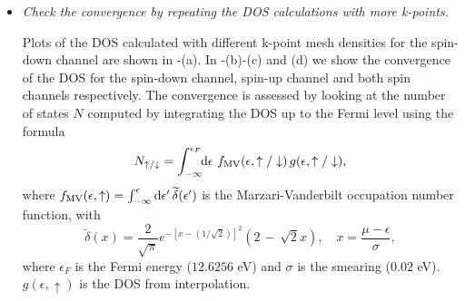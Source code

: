 \begin{itemize}
	\item {\it Check the convergence by repeating the DOS calculations with more k-points.}

	Plots of the DOS calculated with different k-point mesh densities for the spin-down channel are shown in -(a). In -(b)-(c) and (d) we show the convergence of the DOS for the spin-down channel, spin-up channel and both spin channels respectively. The convergence is assessed by looking at the number of states $N$ computed by integrating the DOS up to the Fermi level using the formula
	\begin{equation}
	N_{\uparrow/\downarrow} = \int_{-\infty}^{\epsilon_F}\!\! \mathrm{d}\epsilon\,\, f\tinysub{MV}(\epsilon,\uparrow/\downarrow)\, g(\epsilon,\uparrow/\downarrow),
	\end{equation}
	where $f\tinysub{MV}(\epsilon,\uparrow) = \int_{-\infty}^{\epsilon} \mathrm{d}\epsilon'\,\widetilde{\delta}(\epsilon')$ is the Marzari-Vanderbilt occupation number function, with $$\widetilde{\delta}(x) = \frac{2}{\sqrt{\pi}}e^{-[x-(1/\sqrt{2})]^2}(2\,-\,\sqrt{2}x), \quad x=\frac{\mu-\epsilon}{\sigma},$$
	where $\epsilon_F$ is the Fermi energy ($12.6256$ eV) and $\sigma$ is the smearing ($0.02$ eV). $g(\epsilon,\uparrow)$ is the DOS from \Wannier{} interpolation.



\end{itemize}

